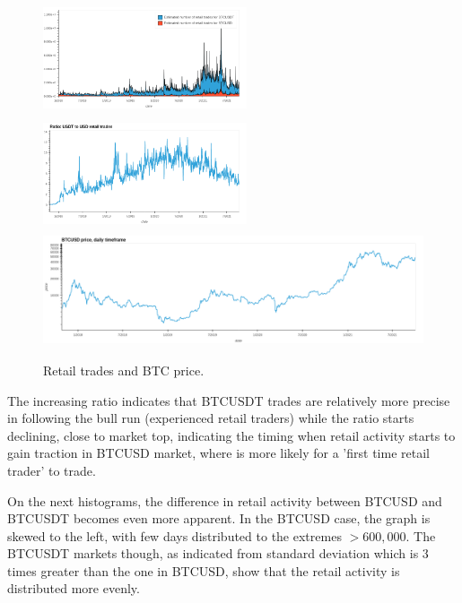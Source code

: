 \documentclass[10pt]{asme2ej}
\begin{document}
\begin{figure}[H]
	\centering
	\includegraphics[width=6cm, height = 3.3cm]{ret_trades_1.png}
	\includegraphics[width=6cm, height = 3.3cm]{ratio_ret_trades.png}
	\\[\smallskipamount]
	\includegraphics[width=12.2cm, height = 3.3cm]{price_retail.png}
	\caption{Retail trades and BTC price.}
	\label{fig:ret1}
\end{figure}

The increasing ratio indicates that BTCUSDT trades are relatively more precise in following the bull run (experienced retail traders) while the ratio starts declining, close to market top, indicating the timing when retail activity starts to gain traction in BTCUSD market, where is more likely for a 'first time retail trader' to trade.

On the next histograms, the difference in retail activity between BTCUSD and BTCUSDT becomes even more apparent. In the BTCUSD case, the graph is skewed to the left, with few days distributed to the extremes \( > 600,000 \). The BTCUSDT markets though, as indicated from standard deviation which is 3 times greater than the one in BTCUSD, show that the retail activity is distributed more evenly.
\end{document}
